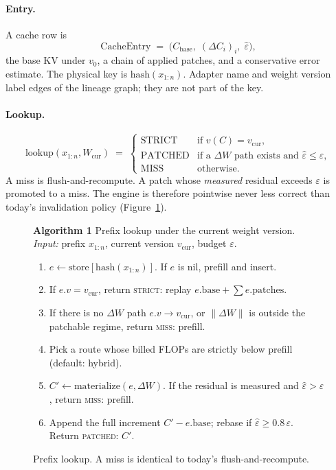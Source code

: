 \documentclass{article}
\begin{document}
\paragraph{Entry.}
A cache row is
\begin{equation}
  \mathrm{CacheEntry}
  \;=\;
  \bigl(C_{\mathrm{base}},\;(\Delta C_i)_i,\;\hat\varepsilon\bigr),
\end{equation}
the base KV under $v_0$, a chain of applied patches, and a conservative
error estimate.
The physical key is $\mathrm{hash}(x_{1:n})$.
Adapter name and weight version label edges of the lineage graph; they
are not part of the key.

\paragraph{Lookup.}
\begin{equation}
  \mathrm{lookup}(x_{1:n},W_{\mathrm{cur}})
  \;=\;
  \begin{cases}
    \mathrm{STRICT}  & \text{if } v(C)=v_{\mathrm{cur}},\\
    \mathrm{PATCHED} & \text{if a }\Delta W\text{ path exists and }\hat\varepsilon\le\varepsilon,\\
    \mathrm{MISS}    & \text{otherwise.}
  \end{cases}
\end{equation}
A miss is flush-and-recompute.
A patch whose \emph{measured} residual exceeds $\varepsilon$ is promoted
to a miss.
The engine is therefore pointwise never less correct than today's
invalidation policy (Figure~\ref{alg:lookup}).

\begin{figure}[t]
\centering
\small
\begin{minipage}{0.92\linewidth}
\textbf{Algorithm 1} Prefix lookup under the current weight version.\\[4pt]
\textit{Input:} prefix $x_{1:n}$, current version $v_{\mathrm{cur}}$, budget $\varepsilon$.
\begin{enumerate}[leftmargin=1.6em,itemsep=1pt,topsep=4pt]
\item $e \gets \mathrm{store}[\mathrm{hash}(x_{1:n})]$. If $e$ is nil, prefill and insert.
\item If $e.v = v_{\mathrm{cur}}$, return \textsc{strict}: replay $e.\mathrm{base}+\sum e.\mathrm{patches}$.
\item If there is no $\Delta W$ path $e.v\to v_{\mathrm{cur}}$, or $\|\Delta W\|$ is outside the patchable regime, return \textsc{miss}: prefill.
\item Pick a route whose billed FLOPs are strictly below prefill (default: hybrid).
\item $C' \gets \mathrm{materialize}(e,\Delta W)$. If the residual is measured and $\hat\varepsilon>\varepsilon$, return \textsc{miss}: prefill.
\item Append the full increment $C'-e.\mathrm{base}$; rebase if $\hat\varepsilon\ge 0.8\,\varepsilon$. Return \textsc{patched}: $C'$.
\end{enumerate}
\end{minipage}
\caption{Prefix lookup. A miss is identical to today's flush-and-recompute.}
\label{alg:lookup}
\end{figure}
\end{document}
